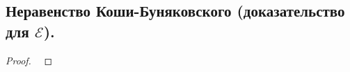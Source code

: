 \subsection{
    Неравенство Коши-Буняковского (доказательство для $\mathcal{E}$).
}


\begin{proof}~

    
\end{proof}
